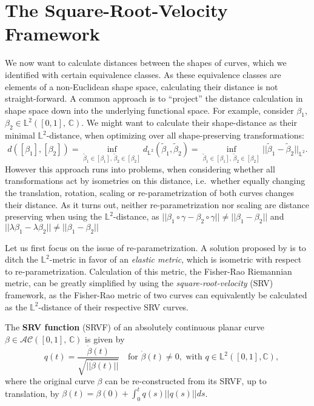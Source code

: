 \section{The Square-Root-Velocity Framework}
\label{theo:srv}
We now want to calculate distances between the shapes of curves, which we identified with certain equivalence classes.
As these equivalence classes are elements of a non-Euclidean shape space, calculating their distance is not straight-forward.
A common approach is to \enquote{project} the distance calculation in shape space down into the underlying functional space.
For example, consider $\beta_1$, $\beta_2 \in \mathbb{L}^2([0,1],\, \mathbb{C})$.
We might want to calculate their shape-distance as their minimal $\mathbb{L}^2$-distance, when optimizing over all shape-preserving transformations:
$$d([\beta_1], [\beta_2]) = \inf_{\tilde \beta_1 \in [\beta_1],\,\tilde \beta_2 \in [\beta_2]} d_{\mathbb{L}^2}(\tilde \beta_1, \tilde \beta_2) = \inf_{\tilde\beta_1 \in [\beta_1],\, \tilde\beta_2 \in [\beta_2]} || \tilde\beta_1 - \tilde\beta_2 ||_{\mathbb{L}^2}.$$
However this approach runs into problems, when considering whether all transformations act by isometries on this distance, i.e.\ whether equally changing the translation, rotation, scaling or re-parametrization of both curves changes their distance. 
As it turns out, neither re-parametrization nor scaling are distance preserving when using the $\mathbb{L}^2$-distance, as $||\beta_1 \circ \gamma - \beta_2 \circ \gamma|| \neq ||\beta_1 - \beta_2||$ and $||\lambda \beta_1 - \lambda \beta_2|| \neq ||\beta_1 - \beta_2||$ 

Let us first focus on the issue of re-parametrization.
A solution proposed by \cite{SrivastavaEtAl2011} is to ditch the $\mathbb{L}^2$-metric in favor of an \textit{elastic metric}, which is isometric with respect to re-parametrization.
Calculation of this metric, the Fisher-Rao Riemannian metric, can be greatly simplified by using the \textit{square-root-velocity} (SRV) framework, as the Fisher-Rao metric of two curves can equivalently be calculated as the $\mathbb{L}^2$-distance of their respective SRV curves.

\begin{definition}
  The \textbf{SRV function} (SRVF) of an absolutely continuous planar curve $\beta \in \mathcal{AC}([0,1],\,\mathbb{C})$ is given by
  $$ \quad q(t) = \frac{\dot{\beta}(t)}{\sqrt{|| \dot{\beta}(t) ||}} \quad \text{for} \,\, \dot{\beta}(t) \neq 0, \,\, \text{with} \,\, q \in \mathbb{L}^2([0,1], \mathbb{C}),$$
  where the original curve $\beta$ can be re-constructed from its SRVF, up to translation, by $\beta(t) = \beta(0) + \int_0^t q(s) || q(s) || ds$.
\end{definition}

